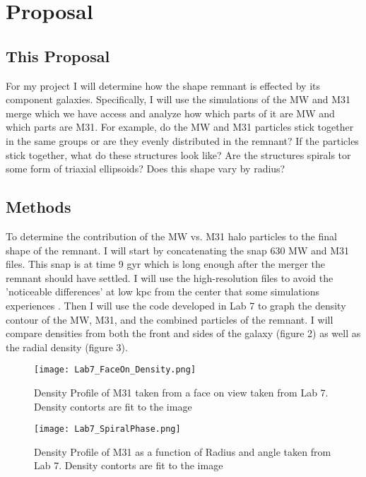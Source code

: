 \documentclass[linenumbers,trackchanges]{aastex7}
\begin{document}
\section{Proposal}
\subsection{This Proposal}

For my project I will determine how the shape remnant is effected by its component galaxies. Specifically, I will use the simulations of the MW and M31 merge which we have access and analyze how which parts of it are MW and which parts are M31. For example, do the MW and M31 particles stick together in the same groups or are they evenly distributed in the remnant? If the particles stick together, what do these structures look like? Are the structures spirals tor some form of triaxial ellipsoids? Does this shape vary by radius?

\subsection{Methods}

To determine the contribution of the MW vs. M31 halo particles to the final shape of the remnant. I will start by concatenating the snap 630 MW and M31 files. This snap is at time 9 gyr which is long enough after the merger the remnant should have settled. I will use the high-resolution files to avoid the 'noticeable differences' at low kpc from the center that some simulations experiences \cite{10.1093/mnras/stz2873}. Then I will use the code developed in Lab 7 to graph the density contour of the MW, M31, and the combined particles of the remnant. I will compare densities from both the front and sides of the galaxy (figure 2) as well as the radial density (figure 3).

\begin{figure}
    \centering
    \texttt{[image: Lab7\_FaceOn\_Density.png]}
    \caption{Density Profile of M31 taken from a face on view taken from Lab 7. Density contorts are fit to the image}
    \label{fig:Lab7_FaceOn_Density}
\end{figure}

\begin{figure}
    \centering
    \texttt{[image: Lab7\_SpiralPhase.png]}
    \caption{Density Profile of M31 as a function of Radius and angle taken from Lab 7. Density contorts are fit to the image}
    \label{fig:Lab7_SpiralPhase}
\end{figure}
\end{document}
